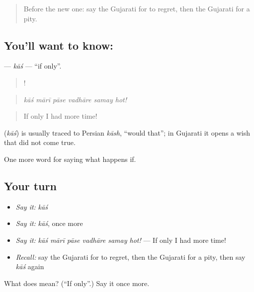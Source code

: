 \label{lesson:GU-C381-kas}



\begin{quote}
Before the new one: say the Gujarati for to regret, then the Gujarati for a pity.
\end{quote}

\subsection*{You'll want to know: }
\textbf{} — \emph{kāś} — \textquotedblleft{}if only\textquotedblright{}.

\begin{quote}
     !
\end{quote}

\begin{quote}
\emph{kāś mārī pāse vadhāre samay hot!}
\end{quote}

\begin{quote}
If only I had more time!
\end{quote}

\begin{cousinweb}
\textbf{} (\emph{kāś}) is usually traced to Persian \emph{kāsh}, \textquotedblleft{}would that\textquotedblright{}; in Gujarati it opens a wish that did not come true.
\end{cousinweb}

\begin{grammarlens}[title={What you've built}]
One more word for saying what happens if.
\end{grammarlens}

\subsection*{Your turn}
\begin{itemize}
\raggedright
  \item \emph{Say it:} \emph{kāś}
  \item \emph{Say it:} \emph{kāś}, once more
  \item \emph{Say it:} \emph{kāś mārī pāse vadhāre samay hot!} — If only I had more time!
  \item \emph{Recall:} say the Gujarati for to regret, then the Gujarati for a pity, then say \emph{kāś} again
\end{itemize}

\begin{tcolorbox}[breakable,colback=teal!4,colframe=teal!35!black,title={Before you move on}]
What does  mean? (\textquotedblleft{}If only\textquotedblright{}.) Say it once more.
\end{tcolorbox}
